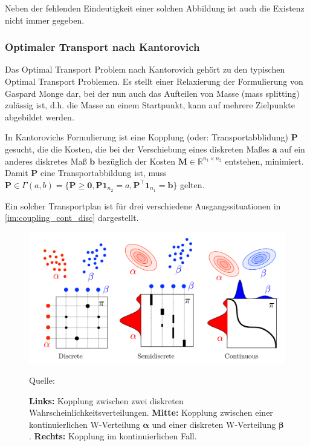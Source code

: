 \documentclass[11pt,a4paper]{article}
\newcommand{\source}[1]{\caption*{\hfill Quelle: {#1}} }
\numberwithin{equation}{section}
\begin{document}
	Neben der fehlenden Eindeutigkeit einer solchen Abbildung ist auch die Existenz nicht immer gegeben.
	
	\subsubsection{Optimaler Transport nach Kantorovich}
	
	Das Optimal Transport Problem nach Kantorovich gehört zu den typischen Optimal Transport Problemen. Es stellt einer Relaxierung der Formulierung von Gaspard Monge dar, bei der nun auch das Aufteilen von Masse (mass splitting) zulässig ist, d.h. die Masse an einem Startpunkt, kann auf mehrere Zielpunkte abgebildet werden.
	
	In Kantorovichs Formulierung ist eine Kopplung (oder: Transportabblidung) $\boldsymbol{P}$ gesucht, die die Kosten, die bei der Verschiebung eines diskreten Maßes $\boldsymbol{a}$ auf ein anderes diskretes Maß $\boldsymbol{b}$ bezüglich der Kosten $\boldsymbol{M} \in \mathbb{R}^{n_1 \times n_2}$ entstehen, minimiert.
	Damit $\boldsymbol{P}$ eine Transportabbildung ist, muss $\boldsymbol{P} \in \Gamma(a,b) = \lbrace \boldsymbol{P} \geq \boldsymbol{0}, \boldsymbol{P}\boldsymbol{1}_{n_2} = a, \boldsymbol{P}^\top\boldsymbol{1}_{n_1} = \boldsymbol{b} \rbrace$ gelten.
	
	Ein solcher Transportplan ist für drei verschiedene Ausgangssituationen in \autoref{im:coupling_cont_disc} dargestellt.
	
	\begin{figure}[ht]
		\centering
		\includegraphics[width=0.4\textheight]{coupling_disc_semid_cont.png}
		\caption[Transportpläne im diskreten, semi-diskreten und kontinuierlichen Fall]{\textbf{Links: }Kopplung zwischen zwei diskreten Wahrscheinlichkeitsverteilungen. \textbf{ Mitte: }Kopplung zwischen einer kontinuierlichen W-Verteilung $\boldsymbol{\alpha}$ und einer diskreten W-Verteilung $\boldsymbol{\beta}$. \textbf{Rechts: }Kopplung im kontinuierlichen Fall.}
		\source{\cite{COTcuturi}}
		\label{im:couplings}
	\end{figure}
	
\end{document}
